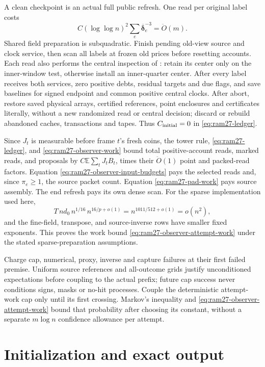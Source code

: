 \documentclass[11pt]{article}
\theoremstyle{remark}
\newcommand{\ddeltabar}{\overline{\boldsymbol{\delta}}}
\newcommand{\Ex}{\mathbb E}
\renewcommand{\O}{\ddot{O}}
\begin{document}
A clean checkpoint is an actual full public refresh.
One read per original label costs
\[
 C(\log\log n)^2\sum_e\ddeltabar_e^{-3}=\O(m).
\]
Shared field preparation is subquadratic.
Finish pending old-view source and clock service, then scan all labels at frozen
old prices before resetting accounts.
Each read also performs the central inspection of
: retain its center only on the inner-window
test, otherwise install an inner-quarter center.
After every label receives both services, zero positive debts, residual targets
and due flags, and save baselines for signed endpoint and common positive
central clocks.
After abort, restore saved physical arrays, certified references, point
enclosures and certificates literally, without a new randomized read or central
decision; discard or rebuild abandoned caches, transactions and tapes.
Thus $C_{\rm initial}=0$ in \eqref{eq:ram27-ledger}.

Since $J_t$ is measurable before frame $t$'s fresh coins, the tower rule,
\eqref{eq:ram27-ledger}, and \eqref{eq:ram27-observer-work} bound total
positive-account reads, marked reads, and proposals by $C\Ex\sum_tJ_t B_t$,
times their $\O(1)$ point and packed-read factors.
Equation \eqref{eq:ram27-observer-input-budgets} pays the selected reads and,
since $\pi_e\ge1$, the source packet count.
Equation \eqref{eq:ram27-pad-work} pays source assembly.
The end refresh pays its own dense scan.
For the sparse implementation used here,
\[
 T\,n d_0\,n^{1/16}\,n^{16/p+o(1)}
       =n^{1011/512+o(1)}=o(n^2),
\]
and the fine-field, transpose, and source-inverse rows have smaller fixed
exponents.
This proves the work bound \eqref{eq:ram27-observer-attempt-work} under the
stated sparse-preparation assumptions.

Charge cap, numerical, proxy, inverse and capture failures at their first failed
premise.
Uniform source references and all-outcome grids justify unconditioned
expectations before coupling to the actual prefix; future cap success never
conditions signs, masks or no-hit processes.
Couple the deterministic attempt-work cap only until its first crossing.
Markov's inequality and \eqref{eq:ram27-observer-attempt-work} bound that
probability after choosing its constant, without a separate $m\log n$ confidence
allowance per attempt.

\section{Initialization and exact output}
\label{sec:ram27-endpoints}
\end{document}
